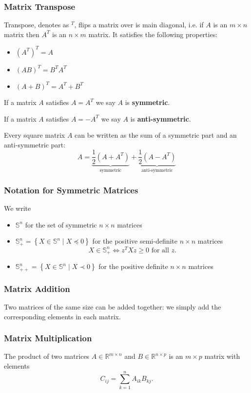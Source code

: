 \documentclass[11pt]{article}
\begin{document}
\subsubsection*{Matrix Transpose}
Transpose, denotes as $^T$, flips a matrix over is main diagonal, i.e. if $A$ is an $m \times n$ matrix then $A^T$ is an $n \times m$ matrix. It satisfies the following properties: 
\begin{itemize}
    \item $(A^T)^T = A$
    \item $(AB)^T = B^TA^T$
    \item $(A+B)^T = A^T + B^T$
\end{itemize}
If a matrix $A$ satisfies $A = A^T$ we say $A$ is \textbf{symmetric}. \par 
If a matrix $A$ satisfies $A = -A^T$ we say $A$ is \textbf{anti-symmetric}. \par 
Every square matrix $A$ can be written as the sum of a symmetric part and an anti-symmetric part: 
\[ A = \underbrace{\frac{1}{2}\left( A + A^T \right)}_{\text{symmetric}} + \underbrace{\frac{1}{2}\left( A - A^T \right)}_{\text{anti-symmetric}} \] 

\subsubsection*{Notation for Symmetric Matrices} 
We write 
\begin{itemize}
    \item $\mathbb{S}^n$ for the set of symmetric $n\times n$ matrices
    \item $\mathbb{S}^n_+ = \left\{ X \in \mathbb{S}^n \mid X \preceq 0 \right\}$ for the positive semi-definite $n\times n$ matrices  
    \[ X \in \mathbb{S}^n_+ \Leftrightarrow z^TXz \geq 0 \text{ for all } z. \] 
    \item $\mathbb{S}^n_{++} = \left\{ X \in \mathbb{S}^n \mid X \prec 0 \right\}$ for the positive definite $n\times n$ matrices 
\end{itemize}

\subsubsection*{Matrix Addition}
Two matrices of the same size can be added together: we simply add the corresponding elements in each matrix. 

\subsubsection*{Matrix Multiplication}
The product of two matrices $A \in \mathbb{R}^{m\times n}$ and $B \in \mathbb{R}^{n \times p}$ is an $m \times p$ matrix with elements 
\[ C_{ij} = \sum\limits_{k=1}^n A_{ik}B_{kj}. \] 
\end{document}
